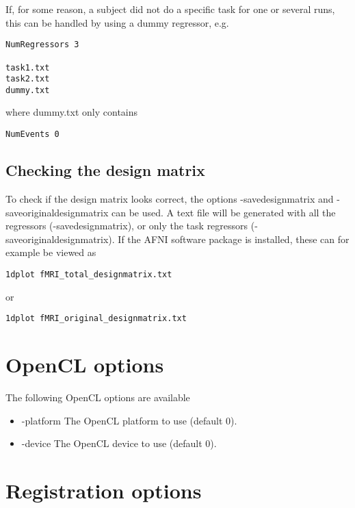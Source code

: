 \noindent If, for some reason, a subject did not do a specific task for one or several runs, this can be handled by using a dummy regressor, e.g.
\begin{verbatim}
NumRegressors 3

task1.txt
task2.txt
dummy.txt
\end{verbatim}
where dummy.txt only contains
\begin{verbatim}
NumEvents 0
\end{verbatim}

\subsection{Checking the design matrix}

To check if the design matrix looks correct, the options -savedesignmatrix and -saveoriginaldesignmatrix can be used. A text file will be generated with all the regressors (-savedesignmatrix), or only the task regressors (-saveoriginaldesignmatrix). If the AFNI software package is installed, these can for example be viewed as

\begin{verbatim}
1dplot fMRI_total_designmatrix.txt
\end{verbatim}
or
\begin{verbatim}
1dplot fMRI_original_designmatrix.txt
\end{verbatim}

\section{OpenCL options}

The following OpenCL options are available

\begin{itemize}

\item -platform
\newline \newline The OpenCL platform to use (default 0).

\item -device
\newline \newline The OpenCL device to use (default 0).

\end{itemize}

\section{Registration options}

